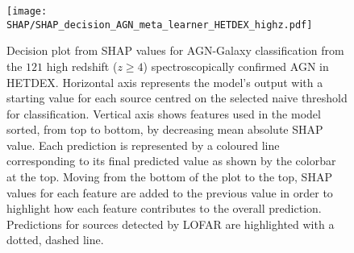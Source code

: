 \documentclass{aa}
\begin{document}
\begin{figure}[t]
    \centering
    \begin{minipage}{0.70\columnwidth}
    \texttt{[image: SHAP/SHAP\_decision\_AGN\_meta\_learner\_HETDEX\_highz.pdf]}
    \end{minipage}%
    \caption{Decision plot from SHAP values for AGN-Galaxy classification from the $121$ high redshift ($z \geq 4$) spectroscopically confirmed AGN in HETDEX. Horizontal axis represents the model's output with a starting value for each source centred on the selected naive threshold for classification. Vertical axis shows features used in the model sorted, from top to bottom, by decreasing mean absolute SHAP value. Each prediction is represented by a coloured line corresponding to its final predicted value as shown by the colorbar at the top. Moving from the bottom of the plot to the top, SHAP values for each feature are added to the previous value in order to highlight how each feature contributes to the overall prediction. Predictions for sources detected by LOFAR are highlighted with a dotted, dashed line.}
   \label{fig:SHAP_decision_AGN_meta_HETDEX_high_z}
\end{figure}
\end{document}
